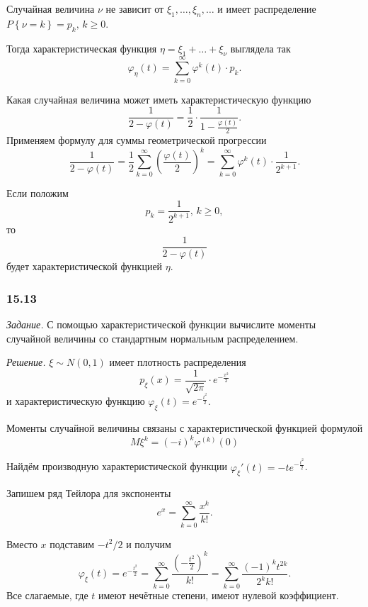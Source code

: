 \begin{enumerate}[label=\alph*)]
Случайная величина $ \nu $ не зависит от $ \xi_1, \dotsc, \xi_n, \dotsc $ и имеет распределение $P \left\{ \nu = k \right\} = p_k, \, k \geq 0$.

Тогда характеристическая функция $ \eta = \xi_1 + \dotsc + \xi_{ \nu }$ выглядела так
$$ \varphi_{ \eta } \left( t \right) =
\sum \limits_{k = 0}^{ \infty } \varphi^k \left( t \right) \cdot p_k.$$

Какая случайная величина может иметь характеристическую функцию
$$ \frac{1}{2 - \varphi \left( t \right) } =
\frac{1}{2} \cdot \frac{1}{1 - \frac{ \varphi \left( t \right) }{2}}.$$
Применяем формулу для суммы геометрической прогрессии
$$ \frac{1}{2 - \varphi \left( t \right) } =
\frac{1}{2} \sum \limits_{k = 0}^{ \infty } \left( \frac{ \varphi \left( t \right) }{2} \right)^k =
\sum \limits_{k = 0}^{ \infty } \varphi^k \left( t \right) \cdot \frac{1}{2^{k+1}}.$$

Если положим
$$p_k = \frac{1}{2^{k+1}}, \,
k \geq 0,$$
то
$$ \frac{1}{2 - \varphi \left( t \right) }$$
будет характеристической функцией $ \eta $.
\end{enumerate}

\subsubsection*{15.13}

\textit{Задание.} С помощью характеристической функции вычислите моменты случайной величины со стандартным нормальным распределением.

\textit{Решение.} $ \xi \sim N \left( 0, 1 \right) $ имеет плотность распределения
$$p_{ \xi } \left( x \right) =
\frac{1}{ \sqrt{2 \pi }} \cdot e^{- \frac{x^2}{2}}$$
и характеристическую функцию $ \varphi_{ \xi } \left( t \right) = e^{- \frac{t^2}{2}}$.

Моменты случайной величины связаны с характеристической функцией формулой
\begin{equation}\label{eq:connection}
  M \xi^k =
\left( -i \right)^k \varphi^{ \left( k \right) } \left( 0 \right) 
\end{equation}

Найдём производную характеристической функции $ \varphi_{ \xi }' \left( t \right) = -te^{- \frac{t^2}{2}}$.

Запишем ряд Тейлора для экспоненты
$$e^x =
\sum \limits_{k = 0}^{ \infty } \frac{x^k}{k!}.$$

Вместо $x$ подставим $-t^2 / 2$ и получим
$$ \varphi_{ \xi } \left( t \right) =
e^{- \frac{t^2}{2}} =
\sum \limits_{k = 0}^{ \infty } \frac{ \left( - \frac{t^2}{2} \right)^k}{k!} =
\sum \limits_{k = 0}^{ \infty } \frac{ \left( -1 \right)^k t^{2k}}{2^k k!}.$$
Все слагаемые, где $t$ имеют нечётные степени, имеют нулевой коэффициент.


